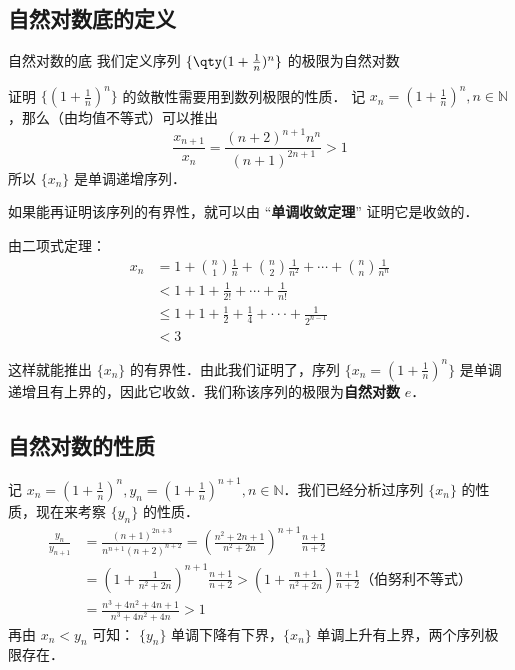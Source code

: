 

\subsection{自然对数底的定义}
\begin{definition}{自然对数的底}
我们定义序列 $\{\qty(1+\frac{1}{n})^n\}$ 的极限为自然对数
\end{definition}
证明 $\{(1+\frac{1}{n})^n\}$ 的敛散性需要用到数列极限的性质．
记 $x_n=(1+\frac{1}{n})^n, n\in \mathbb{N}$，那么（由均值不等式）可以推出
\begin{equation}
  \frac{x_{n+1}}{x_n}=\frac{(n+2)^{n+1}n^{n}}{(n+1)^{2n+1}}>1
\end{equation}
所以 $\{x_n\}$ 是单调递增序列．

  如果能再证明该序列的有界性，就可以由 “\textbf{单调收敛定理}” 证明它是收敛的．

由二项式定理：
\begin{equation}\label{exp_eq1}
\begin{aligned}
  x_n&=1+{n\choose 1}\frac{1}{n}+{n\choose 2}\frac{1}{n^2}+\cdots+{n\choose n}\frac{1}{n^n}\\
  &<1+1+\frac{1}{2!}+\cdots+\frac{1}{n!}\\
  &\leq1+1+\frac{1}{2}+\frac{1}{4}+\cdot\cdot\cdot+\frac{1}{2^{n-1}}\\
  &<3
\end{aligned}
\end{equation}

这样就能推出 $\{x_n\}$ 的有界性．由此我们证明了，序列 $\{x_n=(1+\frac{1}{n})^n\}$ 是单调递增且有上界的，因此它收敛．我们称该序列的极限为\textbf{自然对数} $e$．

  
\subsection{自然对数的性质}
  记 $x_n=(1+\frac{1}{n})^n,y_n=(1+\frac{1}{n})^{n+1}, n\in \mathbb{N}$．我们已经分析过序列 $\{x_n\}$ 的性质，现在来考察 $\{y_n\}$ 的性质．
\begin{equation}
  \begin{aligned}
  \frac{y_n}{y_{n+1}}&=\frac{(n+1)^{2n+3}}{n^{n+1}(n+2)^{n+2}}=\left(\frac{n^2+2n+1}{n^2+2n}\right)^{n+1}\frac{n+1}{n+2}\\
  &=(1+\frac{1}{n^2+2n})^{n+1}\frac{n+1}{n+2}>\left(1+\frac{n+1}{n^2+2n}\right)\frac{n+1}{n+2} \text{（伯努利不等式）}\\
  &=\frac{n^3+4n^2+4n+1}{n^3+4n^2+4n}>1
  \end{aligned}
\end{equation}
  再由 $x_n<y_n$ 可知： $\{y_n\}$ 单调下降有下界，$\{x_n\}$ 单调上升有上界，两个序列极限存在．

